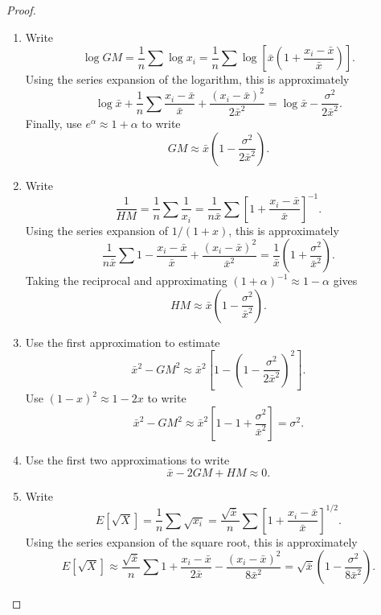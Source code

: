 \documentclass[11pt]{article}
\theoremstyle{definition}
\theoremstyle{remark}
\numberwithin{equation}{section}
\begin{document}
    \begin{proof} \mbox{}
        \begin{enumerate}
            \item Write \[
                \log{GM} = \frac{1}{n}\sum \log{x_i} = \frac{1}{n}\sum
                \log\left[\bar{x}\left(1 + \frac{x_i -
                \bar{x}}{\bar{x}}\right)\right].
            \] Using the series expansion of the logarithm, this is approximately \[
                \log{\bar{x}} + \frac{1}{n}\sum \frac{x_i - \bar{x}}{\bar{x}} +
                \frac{(x_i - \bar{x})^2}{2\bar{x}^2} = 
                \log{\bar{x}} - \frac{\sigma^2}{2\bar{x}^2}.
            \] Finally, use $e^\alpha \approx 1 + \alpha$ to write \[
                GM \approx \bar{x}\left(1 - \frac{\sigma^2}{2\bar{x}^2}\right).
            \] 


            \item Write \[
                \frac{1}{HM} = \frac{1}{n}\sum \frac{1}{x_i} = \frac{1}{n\bar{x}}\sum
                \left[1 + \frac{x_i - \bar{x}}{\bar{x}}\right]^{-1}.
            \] Using the series expansion of $1 / (1 + x)$, this is approximately \[
                \frac{1}{n\bar{x}}\sum 1 - \frac{x_i - \bar{x}}{\bar{x}} + \frac{(x_i
                - \bar{x})^2}{\bar{x}^2} = \frac{1}{\bar{x}} \left(1 +
                \frac{\sigma^2}{\bar{x}^2}\right).
            \] Taking the reciprocal and approximating $(1 + \alpha)^{-1} \approx 1 -
            \alpha$ gives \[
                HM \approx \bar{x}\left(1 - \frac{\sigma^2}{\bar{x}^2}\right).
            \] 

            \item Use the first approximation to estimate \[
                \bar{x}^2 - GM^2 \approx \bar{x}^2\left[1 - \left(1 -
                \frac{\sigma^2}{2\bar{x}^2}\right)^2\right].
            \] Use $(1 - x)^2 \approx 1 - 2x$ to write \[
                \bar{x}^2 - GM^2 \approx \bar{x}^2\left[1 - 1 +
                \frac{\sigma^2}{\bar{x}^2}\right] = \sigma^2.
            \] 


            \item Use the first two approximations to write \[
                \bar{x} - 2GM + HM \approx 0.
            \] 


            \item Write \[
                E[\sqrt{X}] = \frac{1}{n}\sum \sqrt{x_i} = \frac{\sqrt{\bar{x}}}{n}\sum
                \left[1 + \frac{x_i - \bar{x}}{\bar{x}}\right]^{1 / 2}.
            \] Using the series expansion of the square root, this is approximately
            \[
                E[\sqrt{X}] \approx \frac{\sqrt{\bar{x}}}{n}\sum 1 + \frac{x_i -
                \bar{x}}{2\bar{x}} - \frac{(x_i - \bar{x})^2}{8\bar{x}^2} =
                \sqrt{\bar{x}} \left(1 - \frac{\sigma^2}{8\bar{x}^2}\right).
            \] 
        \end{enumerate}
    \end{proof}
\end{document}
